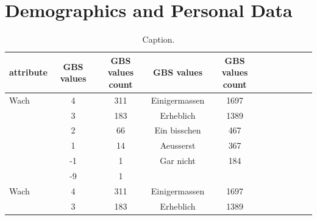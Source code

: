 \section{Demographics and Personal Data}

\begin{table}[ht]
    \begin{center}
            {\footnotesize
            \begin{tabular}{l|c|ccccccccc}
                \hline \hline
		attribute & GBS values & GBS values count &  GBS values & GBS values count \\
                \hline \hline
                     Wach & 4 & 311 & Einigermassen & 1697 \\
                     & 3 & 183 & Erheblich & 1389 \\
                     & 2 & 66 & Ein bisschen & 467 \\ 
              	& 1 & 14 & Aeusserst & 367 \\	
		& -1 & 1 & Gar nicht & 184 \\		
		& -9 & 1 & & \\
		\hline
		Wach & 4 & 311 & Einigermassen & 1697 \\
                     & 3 & 183 & Erheblich & 1389 \\
            \end{tabular}}
        \caption{Caption.}
\end{center}
\end{table}
